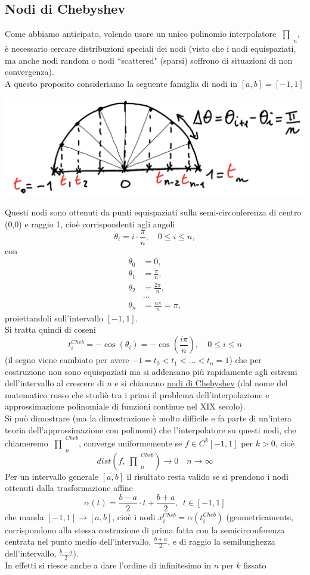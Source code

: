 \documentclass[12pt]{article}
\newcommand{\inter}{\begin{matrix}\prod\end{matrix}}
\begin{document}
\subsection{Nodi di Chebyshev}
Come abbiamo anticipato, volendo usare un unico polinomio interpolatore $\inter_n$, è necessario cercare distribuzioni speciali dei nodi (visto che i nodi equispaziati, ma anche nodi random o nodi ``scattered" (sparsi) soffrono di situazioni di non convergenza).\\
A questo proposito consideriamo la seguente famiglia di nodi in $[a,b]=[-1,1]$
\begin{center}
    \includegraphics[scale=0.5]{lez13_img1.png}
\end{center}
Questi nodi sono ottenuti da punti equispaziati sulla semi-circonferenza di centro (0,0) e raggio 1, cioè corrispondenti agli angoli 
\[\theta_i=i\cdot \frac{\pi}{n}, \quad 0\leq i\leq n,\] 
con 
\[\begin{split}
    \theta_0 & = 0, \\
    \theta_1 & = \frac{\pi}{n}, \\
    \theta_2 & = \frac{2\pi}{n}, \\
    & \dotso \\
    \theta_n & = \frac{n\pi}{n}=\pi,
\end{split}\]
 proiettandoli sull'intervallo $[-1,1]$.\\ 
 Si tratta quindi di coseni 
\[ t_i^{Cheb}=-\cos(\theta_i)=-\cos\left(\frac{i\pi}{n}\right),\quad 0\leq i\leq n \]
(il segno viene cambiato per avere $-1=t_0< t_1<\dotso<t_n=1$) che per costruzione non sono equispaziati ma si addensano  più rapidamente agli estremi dell'intervallo al crescere di $n$ e si chiamano \uline{nodi di Chebyshev} (dal nome del matematico russo che studiò tra i primi il problema dell'interpolazione e approssimazione polinomiale di funzioni continue nel XIX secolo).\\ 
Si può dimostrare (ma la dimostrazione è molto difficile e fa parte di un'intera teoria dell'approssimazione con polinomi) che l'interpolatore su questi nodi, che chiameremo $\inter_n^{Cheb}$, converge uniformemente se $f\in C^k[-1,1]$ per $k>0$, cioè
\[ dist(f,\inter_n^{Cheb})\rightarrow 0 \quad n\rightarrow\infty \]
Per un intervallo generale $[a,b]$ il risultato resta valido se si prendono i nodi ottenuti dalla trasformazione affine
\[ \alpha(t)=\frac{b-a}{2}\cdot t+\frac{b+a}{2},\ \ t\in[-1,1] \]
che manda $[-1,1] \rightarrow [a,b]$, cioè i nodi $x_i^{Cheb}=\alpha(t_i^{Cheb})$ (geometricamente, corrispondono alla stessa costruzione di prima fatta con la semicirconferenza centrata nel punto medio dell'intervallo, $\frac{b+a}{2}$, e di raggio la semilunghezza dell'intervallo, $\frac{b-a}{2}$).\\
In effetti si riesce anche a dare l'ordine di infinitesimo in $n$ per $k$ fissato
\end{document}
